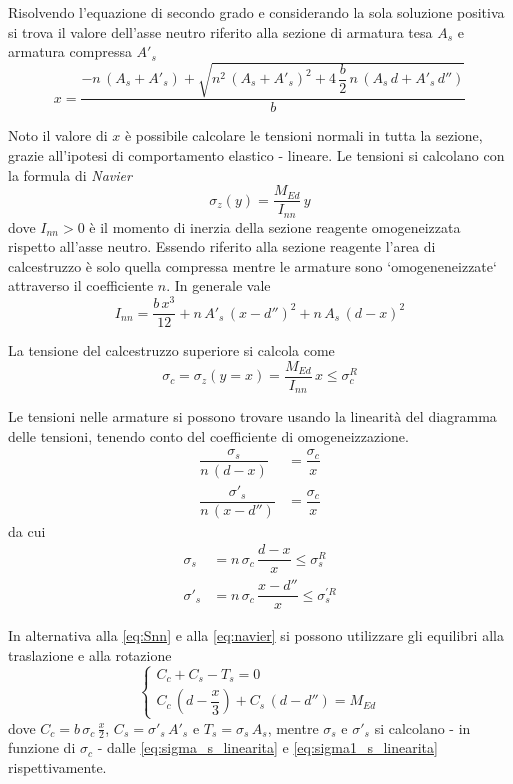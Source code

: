 Risolvendo l'equazione di secondo grado e considerando la sola soluzione positiva si trova il valore dell'asse neutro riferito alla sezione di armatura tesa $A_s$ e armatura compressa $A'_s$
\begin{equation}
	\label{eq:formula_x}
	x =  \dfrac{-n\,(A_s + A'_s) + \sqrt{n^2\,(A_s + A'_s)^2 + 4\,\dfrac{b}{2}\,n\,(A_s\,d + A'_s\,d'')}}{b}
\end{equation}

Noto il valore di $x$ è possibile calcolare le tensioni normali in tutta la sezione, grazie all'ipotesi di comportamento elastico - lineare. Le tensioni si calcolano con la formula di \emph{Navier}
\begin{equation}
	\label{eq:navier}
	\sigma_z (y) = \dfrac{M_{Ed}}{I_{nn}}\,y
\end{equation}
dove $I_{nn} > 0$ è il momento di inerzia della sezione reagente omogeneizzata rispetto all'asse neutro. Essendo riferito alla sezione reagente l'area di calcestruzzo è solo quella compressa mentre le armature sono `omogeneneizzate` attraverso il coefficiente $n$. In generale vale
\[
I_{nn} = \dfrac{b\,x^3}{12} + n\,A'_s\,(x - d'')^2 + n\,A_s\,(d-x)^2    
\]

La tensione del calcestruzzo superiore si calcola come
\begin{equation}
    \label{eq:sigma_c_navier}
	\sigma_c = \sigma_z (y = x) = \dfrac{M_{Ed}}{I_{nn}}\,x \leq \sigma_c^R
\end{equation}

Le tensioni nelle armature si possono trovare usando la linearità del diagramma delle tensioni, tenendo conto del coefficiente di omogeneizzazione.
\begin{align*}
	\dfrac{\sigma_s}{n\,(d-x)} &= \dfrac{\sigma_c}{x}\\
	\dfrac{\sigma'_s}{n\,(x-d'')} &= \dfrac{\sigma_c}{x}
\end{align*}
da cui
\begin{align}
    \label{eq:sigma_s_linearita}
	\sigma_s &= n\,\sigma_c\,\dfrac{d-x}{x} \leq \sigma_s^R\\
	\sigma'_s &= n\,\sigma_c\,\dfrac{x-d''}{x}\leq \sigma_s^{'R}\label{eq:sigma1_s_linearita}
\end{align}

In alternativa alla \eqref{eq:Snn} e alla \eqref{eq:navier} si possono utilizzare gli equilibri alla traslazione e alla rotazione
\[
\begin{cases}
	C_c + C_s - T_s = 0\\
	C_c\,\left(d-\dfrac{x}{3}\right) + C_s\,(d - d'') = M_{Ed}
\end{cases}
\]
dove $C_c = b\,\sigma_c\,\frac{x}{2}$, $C_s = \sigma'_s\,A'_s$ e $T_s = \sigma_s\,A_s$, mentre $\sigma_s$ e $\sigma'_s$ si calcolano - in funzione di $\sigma_c$ - dalle \eqref{eq:sigma_s_linearita} e \eqref{eq:sigma1_s_linearita} rispettivamente.

